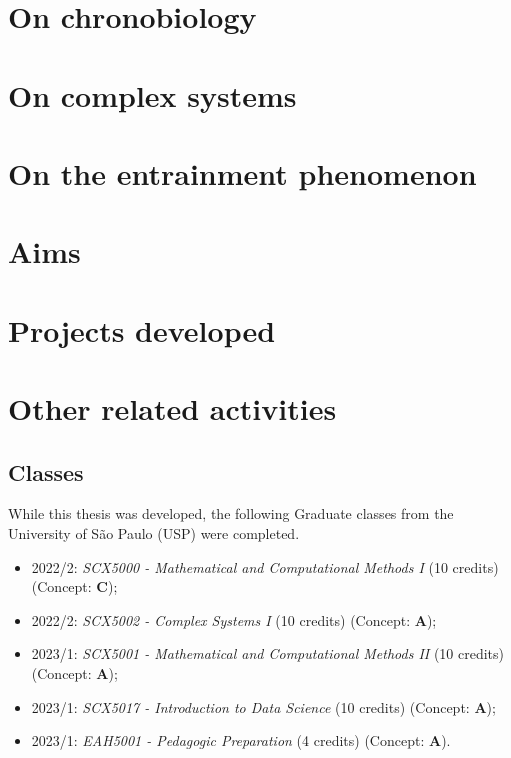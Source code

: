\documentclass[
  12pt,
  a4paper,
  oneside]{tesesusp}
\providecommand{\tightlist}{%
  \setlength{\itemsep}{0pt}\setlength{\parskip}{0pt}}\usepackage{longtable,booktabs,array}
\begin{document}
\vspace{10pt}

\hypertarget{on-chronobiology}{%
\section{On chronobiology}\label{on-chronobiology}}

\hypertarget{on-complex-systems}{%
\section{On complex systems}\label{on-complex-systems}}

\hypertarget{on-the-entrainment-phenomenon}{%
\section{On the entrainment
phenomenon}\label{on-the-entrainment-phenomenon}}

\hypertarget{aims}{%
\section{Aims}\label{aims}}

\hypertarget{projects-developed}{%
\section{Projects developed}\label{projects-developed}}

\hypertarget{other-related-activities}{%
\section{Other related activities}\label{other-related-activities}}

\hypertarget{classes}{%
\subsection{Classes}\label{classes}}

While this thesis was developed, the following Graduate classes from the
University of São Paulo (USP) were completed.

\begin{itemize}
\tightlist
\item
  2022/2: \emph{SCX5000 - Mathematical and Computational Methods I} (10
  credits) (Concept: \textbf{C});
\item
  2022/2: \emph{SCX5002 - Complex Systems I} (10 credits) (Concept:
  \textbf{A});
\item
  2023/1: \emph{SCX5001 - Mathematical and Computational Methods II} (10
  credits) (Concept: \textbf{A});
\item
  2023/1: \emph{SCX5017 - Introduction to Data Science} (10 credits)
  (Concept: \textbf{A});
\item
  2023/1: \emph{EAH5001 - Pedagogic Preparation} (4 credits) (Concept:
  \textbf{A}).
\end{itemize}
\end{document}
